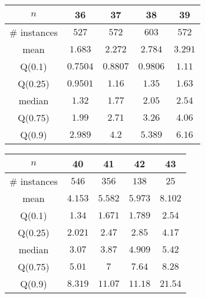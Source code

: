 \begin{tabular}{c|cccc} 
\hline 
$n$ & 36 & 37 & 38 & 39 \tabularnewline 
\hline 
\hline 
\# instances & $527$ & $572$ & $603$ & $572$ \tabularnewline 
mean & $1.683$ & $2.272$ & $2.784$ & $3.291$ \tabularnewline 
Q(0.1) & $0.7504$ & $0.8807$ & $0.9806$ & $1.11$ \tabularnewline 
Q(0.25) & $0.9501$ & $1.16$ & $1.35$ & $1.63$ \tabularnewline 
median & $1.32$ & $1.77$ & $2.05$ & $2.54$ \tabularnewline 
Q(0.75) & $1.99$ & $2.71$ & $3.26$ & $4.06$ \tabularnewline 
Q(0.9) & $2.989$ & $4.2$ & $5.389$ & $6.16$ \tabularnewline 
\hline 
\end{tabular} 
\medskip{} 

\begin{tabular}{c|cccc} 
\hline 
$n$ & 40 & 41 & 42 & 43 \tabularnewline 
\hline 
\hline 
\# instances & $546$ & $356$ & $138$ & $25$ \tabularnewline 
mean & $4.153$ & $5.582$ & $5.973$ & $8.102$ \tabularnewline 
Q(0.1) & $1.34$ & $1.671$ & $1.789$ & $2.54$ \tabularnewline 
Q(0.25) & $2.021$ & $2.47$ & $2.85$ & $4.17$ \tabularnewline 
median & $3.07$ & $3.87$ & $4.909$ & $5.42$ \tabularnewline 
Q(0.75) & $5.01$ & $7$ & $7.64$ & $8.28$ \tabularnewline 
Q(0.9) & $8.319$ & $11.07$ & $11.18$ & $21.54$ \tabularnewline 
\hline 
\end{tabular} 
\medskip{} 

